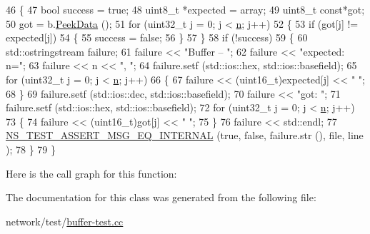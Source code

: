 \begin{DoxyCode}
46 \{
47   \textcolor{keywordtype}{bool} success = \textcolor{keyword}{true};
48   uint8\_t *expected = array;
49   uint8\_t \textcolor{keyword}{const}*got;
50   got = b.\hyperlink{classns3_1_1Buffer_a07800b41f95ec9c5bfdfae624b9351b0}{PeekData} ();
51   \textcolor{keywordflow}{for} (uint32\_t j = 0; j < \hyperlink{namespacesample-rng-plot_aeb5ee5c431e338ef39b7ac5431242e1d}{n}; j++) 
52     \{
53       \textcolor{keywordflow}{if} (got[j] != expected[j]) 
54         \{
55           success = \textcolor{keyword}{false};
56         \}
57     \}
58   \textcolor{keywordflow}{if} (!success) 
59     \{
60       std::ostringstream failure;
61       failure << \textcolor{stringliteral}{"Buffer -- "};
62       failure << \textcolor{stringliteral}{"expected: n="};
63       failure << n << \textcolor{stringliteral}{", "};
64       failure.setf (std::ios::hex, std::ios::basefield);
65       \textcolor{keywordflow}{for} (uint32\_t j = 0; j < \hyperlink{namespacesample-rng-plot_aeb5ee5c431e338ef39b7ac5431242e1d}{n}; j++) 
66         \{
67           failure << (uint16\_t)expected[j] << \textcolor{stringliteral}{" "};
68         \}
69       failure.setf (std::ios::dec, std::ios::basefield);
70       failure << \textcolor{stringliteral}{"got: "};
71       failure.setf (std::ios::hex, std::ios::basefield);
72       \textcolor{keywordflow}{for} (uint32\_t j = 0; j < \hyperlink{namespacesample-rng-plot_aeb5ee5c431e338ef39b7ac5431242e1d}{n}; j++) 
73         \{
74           failure << (uint16\_t)got[j] << \textcolor{stringliteral}{" "};
75         \}
76       failure << std::endl;
77       \hyperlink{group__testingimpl_gaa9d54a0bd3ffaa7f4db82c4a6c1fb83b}{NS\_TEST\_ASSERT\_MSG\_EQ\_INTERNAL} (\textcolor{keyword}{true}, \textcolor{keyword}{false}, failure.str (), file, line
      );
78     \}
79 \}
\end{DoxyCode}


Here is the call graph for this function\+:




The documentation for this class was generated from the following file\+:\begin{DoxyCompactItemize}
\item 
network/test/\hyperlink{buffer-test_8cc}{buffer-\/test.\+cc}\end{DoxyCompactItemize}
